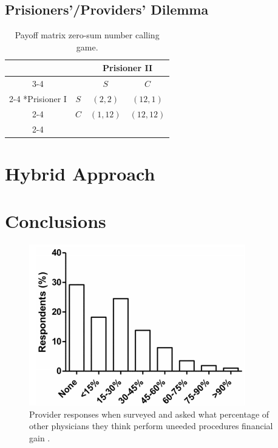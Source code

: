\documentclass{article}
\begin{document}
\subsection*{Prisioners'/Providers' Dilemma}


\begin{table}[H]
\centering
  \setlength{\extrarowheight}{2pt}
  \begin{tabular}{*{4}{c|}}
    \multicolumn{2}{c}{} & \multicolumn{2}{c}{Prisioner II}\\\cline{3-4}
    \multicolumn{1}{c}{} &  & $S$  & $C$ \\\cline{2-4}
    \multirow{2}*{Prisioner I}  & $S$ & $(2,2)$ & $(12,1)$ \\\cline{2-4}
    & $C$ & $(1,12)$ & $(12,12)$ \\\cline{2-4}
  \end{tabular}
\caption{Payoff matrix zero-sum number calling game.}
\end{table}

\section*{Hybrid Approach}

\section*{Conclusions}




\begin{figure}
\includegraphics[height=7cm]{overtreat}
\centering
\caption{Provider responses when surveyed and asked what percentage of other physicians they think perform uneeded procedures financial gain \cite{overtreat}.}
\label{fig:overtreat}
\end{figure}
\end{document}
